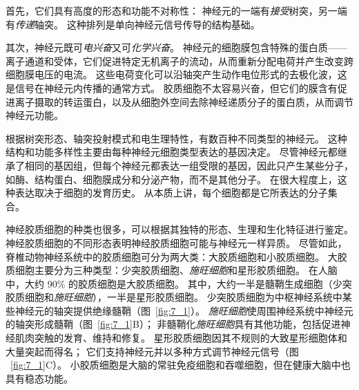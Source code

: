 首先，它们具有高度的形态和功能不对称性：
神经元的一端有\textit{接受}树突，另一端有\textit{传递}轴突。
这种排列是单向神经元信号传导的结构基础。


其次，神经元既可\textit{电兴奋}又可\textit{化学兴奋}。
神经元的细胞膜包含特殊的蛋白质——离子通道和受体，它们促进特定无机离子的流动，从而重新分配电荷并产生改变跨细胞膜电压的电流。
这些电荷变化可以沿轴突产生动作电位形式的去极化波，这是信号在神经元内传播的通常方式。
胶质细胞不太容易兴奋，但它们的膜含有促进离子摄取的转运蛋白，以及从细胞外空间去除神经递质分子的蛋白质，从而调节神经元功能。


根据树突形态、轴突投射模式和电生理特性，有数百种不同类型的神经元。
这种结构和功能多样性主要由每种神经元细胞类型表达的基因决定。
尽管神经元都继承了相同的基因组，但每个神经元都表达一组受限的基因，因此只产生某些分子，如酶、结构蛋白、细胞膜成分和分泌产物，而不是其他分子。
在很大程度上，这种表达取决于细胞的发育历史。
从本质上讲，每个细胞都是它所表达的分子集合。


神经胶质细胞的种类也很多，可以根据其独特的形态、生理和生化特征进行鉴定。
神经胶质细胞的不同形态表明神经胶质细胞可能与神经元一样异质。
尽管如此，脊椎动物神经系统中的胶质细胞可分为两大类：大胶质细胞和小胶质细胞。
大胶质细胞主要分为三种类型：少突胶质细胞、\textit{施旺细胞}和星形胶质细胞。
在人脑中，大约 90\% 的胶质细胞是大胶质细胞。
其中，大约一半是髓鞘生成细胞（少突胶质细胞和\textit{施旺细胞}），一半是星形胶质细胞。
少突胶质细胞为中枢神经系统中某些神经元的轴突提供绝缘髓鞘（图~\ref{fig:7_1}）。
\textit{施旺细胞}使周围神经系统中神经元的轴突形成髓鞘（图~\ref{fig:7_1}B）；
非髓鞘化\textit{施旺细胞}具有其他功能，包括促进神经肌肉突触的发育、维持和修复。
星形胶质细胞因其不规则的大致星形细胞体和大量突起而得名；
它们支持神经元并以多种方式调节神经元信号（图 ~\ref{fig:7_1}C）。 
小胶质细胞是大脑的常驻免疫细胞和吞噬细胞，但在健康大脑中也具有稳态功能。


